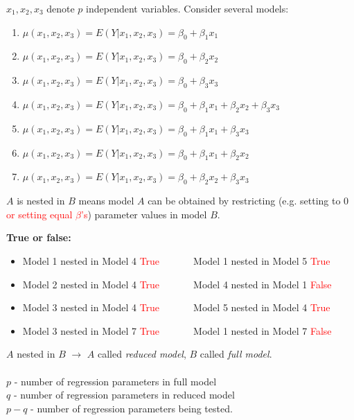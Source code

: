 \documentclass{article}
\begin{document}
$x_1,x_2,x_3$ denote $p$ independent variables.  Consider
several models:
\begin{enumerate}
\item $\mu(x_1,x_2,x_3) = E(Y|x_1,x_2,x_3) =  \beta_0 + \beta_1 x_1$
\item $\mu(x_1,x_2,x_3) = E(Y|x_1,x_2,x_3) =  \beta_0 + \beta_2 x_2$
\item $\mu(x_1,x_2,x_3) = E(Y|x_1,x_2,x_3) =  \beta_0 + \beta_3 x_3$
\item $\mu(x_1,x_2,x_3) = E(Y|x_1,x_2,x_3) =  \beta_0 + \beta_1 x_1 + \beta_2 x_2 + \beta_3 x_3$
\item $\mu(x_1,x_2,x_3) = E(Y|x_1,x_2,x_3) =  \beta_0 + \beta_1 x_1 + \beta_3 x_3$
\item $\mu(x_1,x_2,x_3) = E(Y|x_1,x_2,x_3) =  \beta_0 + \beta_1 x_1 + \beta_2 x_2$
\item $\mu(x_1,x_2,x_3) = E(Y|x_1,x_2,x_3) =  \beta_0 + \beta_2 x_2 + \beta_3 x_3$
\end{enumerate}
$A$ is nested in $B$ means model $A$ can be obtained by restricting (e.g. setting to 0 \textcolor{red}{or setting equal $\beta$'s}) parameter values in model $B$.

\textbf{True or false:}
\begin{itemize}
\item Model 1 nested in Model 4 \textcolor{red}{True}~~~~~~~Model 1 nested in Model 5 \textcolor{red}{True}
\item Model 2 nested in Model 4 \textcolor{red}{True}~~~~~~~Model 4 nested in Model 1 \textcolor{red}{False}
\item Model 3 nested in Model 4 \textcolor{red}{True}~~~~~~~Model 5 nested in Model 4 \textcolor{red}{True}
\item Model 3 nested in Model 7 \textcolor{red}{True}~~~~~~~Model 1 nested in Model 7 \textcolor{red}{False}
\end{itemize}

$A$ nested in $B$ $\longrightarrow$ $A$ called {\em reduced model}, $B$ called {\em full model}.  \\~\\

$p$ - number of regression parameters in full model  \\
$q$ - number of regression parameters in reduced model \\
$p-q$ - number of regression parameters being tested. \\~\\
\end{document}
